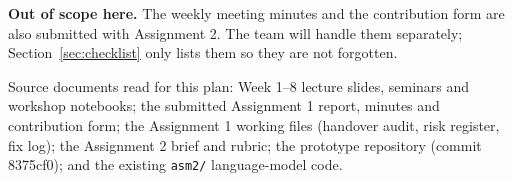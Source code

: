 \documentclass[a4paper,11pt]{article}
\begin{document}
\begin{titlepage}
\begin{summarybox}
\textbf{Out of scope here.} The weekly meeting minutes and the contribution form are also submitted
with Assignment 2. The team will handle them separately; Section~\ref{sec:checklist} only lists
them so they are not forgotten.
\end{summarybox}
\vfill
{\small\color{grey}Source documents read for this plan: Week 1--8 lecture slides, seminars and
workshop notebooks; the submitted Assignment 1 report, minutes and contribution form; the
Assignment 1 working files (handover audit, risk register, fix log); the Assignment 2 brief and
rubric; the prototype repository (commit 8375cf0); and the existing \texttt{asm2/} language-model code.}
\end{titlepage}

\tableofcontents
\clearpage

















\appendix




\end{document}
